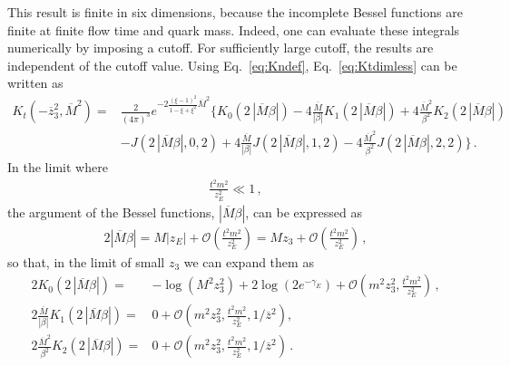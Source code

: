 This result is finite in six dimensions, because the incomplete Bessel functions
are finite at finite flow time and quark mass. Indeed, one can evaluate these
integrals numerically by imposing a cutoff. 
For sufficiently large cutoff, the
results are independent of the cutoff value. 
Using Eq.~\eqref{eq:Kndef}, Eq.~\eqref{eq:Ktdimless} can be written as
\begin{align}
        \label{eq:KtBessel}
        K_t\left(-\overline{z}_3^2, \overline{M}^2\right) = 
        {} & \frac{2}{(4\pi)^3} 
        e^{-2\frac{(\xi-1)^2}{1-\xi+\xi^2}\overline{M}^2} 
        \bigg\{
        K_0(2\,|\overline{M}\beta|) - 
        4\frac{\overline{M}}{|\beta|} K_1(2\,|\overline{M}\beta|) + 
        4\frac{\overline{M}^2}{\beta^2} K_2(2\,|\overline{M}\beta|) \nonumber \\
        {} & - J(2\,|\overline{M}\beta|,0,2) +4\frac{\overline{M}}{|\beta|} J(2\,|\overline{M}\beta|,1,2) -4 \frac{\overline{M}^2}{\beta^2}J(2\,|\overline{M}\beta|,2,2)\bigg\}\, .
\end{align}
In the limit where 
\begin{align}
        \frac{t^2 m^2}{z_E^2} \ll 1\, ,
\end{align}
the argument of the Bessel functions, $|\overline{M}\beta|$, can be expressed as
\begin{align}
        2|\overline{M}\beta| = M |z_E| 
                + \mathcal{O}\left(\frac{t^2 m^2}{z_E^2}\right) 
        = M z_3 + \mathcal{O}\left(\frac{t^2 m^2}{z_E^2}\right)\, ,
\end{align}
so that, in the limit of small $z_3$ we can expand them as
\begin{align}
        2K_0(2\,|\overline{M}\beta|) = {} & - \log\left(M^2 z_3^2\right) 
        + 2 \log\left(2e^{-\gamma_E}\right) + 
        \mathcal{O}\left(m^2 z_3^2,\frac{t^2 m^2}{z_E^2}\right)\,,
        \label{eq::k0t}\\
        2\frac{\overline{M}}{|\beta|}K_1(2\,|\overline{M}\beta|) 
        = {} & 0 + \mathcal{O}\left(m^2z_3^2,\frac{t^2 m^2}{z_E^2},
        1/\overline{z}^2\right) ,\label{eq::k1t}\\
        2\frac{\overline{M}^2}{\beta^2}K_2(2\,|\overline{M}\beta|) 
        = {} & 0 + 
        \mathcal{O}\left(m^2z_3^2,\frac{t^2 m^2}{z_E^2},1/\overline{z}^2\right)
        \, . \label{eq::k2t}
\end{align} 

